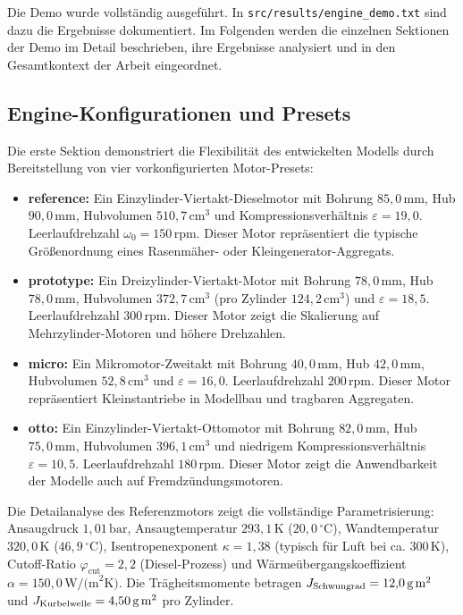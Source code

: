 ﻿\documentclass[a4paper,12pt]{article}
\begin{document}
Die Demo wurde vollständig ausgeführt. In \texttt{src/results/engine\_demo.txt} sind dazu die Ergebnisse dokumentiert. Im Folgenden werden
die einzelnen Sektionen der Demo im Detail beschrieben, ihre Ergebnisse
analysiert und in den Gesamtkontext der Arbeit eingeordnet.

\subsection{Engine-Konfigurationen und Presets}

Die erste Sektion demonstriert die Flexibilität des entwickelten Modells
durch Bereitstellung von vier vorkonfigurierten Motor-Presets:

\begin{itemize}
  \item \textbf{reference:} Ein Einzylinder-Viertakt-Dieselmotor
    mit Bohrung $85{,}0\,\text{mm}$, Hub $90{,}0\,\text{mm}$, Hubvolumen
    $510{,}7\,\text{cm}^3$ und Kompressionsverhältnis $\varepsilon = 19{,}0$.
    Leerlaufdrehzahl $\omega_0 = 150\,\text{rpm}$. Dieser Motor repräsentiert
    die typische Größenordnung eines Rasenmäher- oder Kleingenerator-Aggregats.

  \item \textbf{prototype:} Ein Dreizylinder-Viertakt-Motor mit Bohrung
    $78{,}0\,\text{mm}$, Hub $78{,}0\,\text{mm}$, Hubvolumen $372{,}7\,\text{cm}^3$
    (pro Zylinder $124{,}2\,\text{cm}^3$) und $\varepsilon = 18{,}5$.
    Leerlaufdrehzahl $300\,\text{rpm}$. Dieser Motor zeigt die Skalierung
    auf Mehrzylinder-Motoren und höhere Drehzahlen.

  \item \textbf{micro:} Ein Mikromotor-Zweitakt mit Bohrung $40{,}0\,\text{mm}$,
    Hub $42{,}0\,\text{mm}$, Hubvolumen $52{,}8\,\text{cm}^3$ und
    $\varepsilon = 16{,}0$. Leerlaufdrehzahl $200\,\text{rpm}$. Dieser
    Motor repräsentiert Kleinstantriebe in Modellbau und tragbaren Aggregaten.

  \item \textbf{otto:} Ein Einzylinder-Viertakt-Ottomotor mit Bohrung
    $82{,}0\,\text{mm}$, Hub $75{,}0\,\text{mm}$, Hubvolumen $396{,}1\,\text{cm}^3$
    und niedrigem Kompressionsverhältnis $\varepsilon = 10{,}5$. Leerlaufdrehzahl
    $180\,\text{rpm}$. Dieser Motor zeigt die Anwendbarkeit der Modelle auch
    auf Fremdzündungsmotoren.
\end{itemize}

Die Detailanalyse des Referenzmotors zeigt die vollständige Parametrisierung:
Ansaugdruck $1{,}01\,\text{bar}$, Ansaugtemperatur $293{,}1\,\text{K}$
($20{,}0\,^\circ\text{C}$), Wandtemperatur $320{,}0\,\text{K}$ ($46{,}9\,^\circ\text{C}$),
Isentropenexponent $\kappa = 1{,}38$ (typisch für Luft bei ca. $300\,\text{K}$),
Cutoff-Ratio $\varphi_\text{cut} = 2{,}2$ (Diesel-Prozess) und Wärmeübergangskoeffizient
$\alpha = 150{,}0\,\text{W/(m}^2\text{K)}$. Die Trägheitsmomente betragen
$J_\text{Schwungrad} = 12{,}0\,\text{g\,m}^2$ und $J_\text{Kurbelwelle} = 4{,}50\,\text{g\,m}^2$
pro Zylinder.
\end{document}
